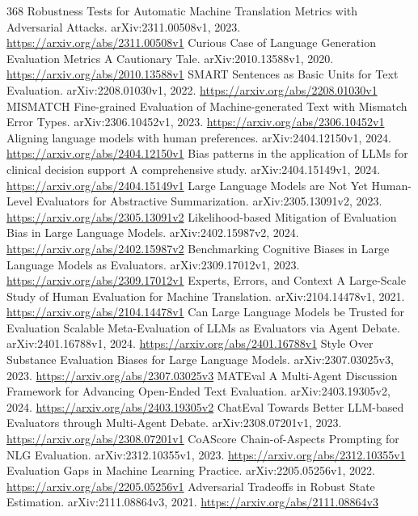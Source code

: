 \documentclass[11pt]{article}
\begin{document}
\begin{thebibliography}{368}
 Robustness Tests for Automatic Machine Translation Metrics with Adversarial Attacks. arXiv:2311.00508v1, 2023. \url{https://arxiv.org/abs/2311.00508v1}
 Curious Case of Language Generation Evaluation Metrics A Cautionary Tale. arXiv:2010.13588v1, 2020. \url{https://arxiv.org/abs/2010.13588v1}
 SMART Sentences as Basic Units for Text Evaluation. arXiv:2208.01030v1, 2022. \url{https://arxiv.org/abs/2208.01030v1}
 MISMATCH Fine-grained Evaluation of Machine-generated Text with Mismatch Error Types. arXiv:2306.10452v1, 2023. \url{https://arxiv.org/abs/2306.10452v1}
 Aligning language models with human preferences. arXiv:2404.12150v1, 2024. \url{https://arxiv.org/abs/2404.12150v1}
 Bias patterns in the application of LLMs for clinical decision support A comprehensive study. arXiv:2404.15149v1, 2024. \url{https://arxiv.org/abs/2404.15149v1}
 Large Language Models are Not Yet Human-Level Evaluators for Abstractive Summarization. arXiv:2305.13091v2, 2023. \url{https://arxiv.org/abs/2305.13091v2}
 Likelihood-based Mitigation of Evaluation Bias in Large Language Models. arXiv:2402.15987v2, 2024. \url{https://arxiv.org/abs/2402.15987v2}
 Benchmarking Cognitive Biases in Large Language Models as Evaluators. arXiv:2309.17012v1, 2023. \url{https://arxiv.org/abs/2309.17012v1}
 Experts, Errors, and Context A Large-Scale Study of Human Evaluation for Machine Translation. arXiv:2104.14478v1, 2021. \url{https://arxiv.org/abs/2104.14478v1}
 Can Large Language Models be Trusted for Evaluation Scalable Meta-Evaluation of LLMs as Evaluators via Agent Debate. arXiv:2401.16788v1, 2024. \url{https://arxiv.org/abs/2401.16788v1}
 Style Over Substance Evaluation Biases for Large Language Models. arXiv:2307.03025v3, 2023. \url{https://arxiv.org/abs/2307.03025v3}
 MATEval A Multi-Agent Discussion Framework for Advancing Open-Ended Text Evaluation. arXiv:2403.19305v2, 2024. \url{https://arxiv.org/abs/2403.19305v2}
 ChatEval Towards Better LLM-based Evaluators through Multi-Agent Debate. arXiv:2308.07201v1, 2023. \url{https://arxiv.org/abs/2308.07201v1}
 CoAScore Chain-of-Aspects Prompting for NLG Evaluation. arXiv:2312.10355v1, 2023. \url{https://arxiv.org/abs/2312.10355v1}
 Evaluation Gaps in Machine Learning Practice. arXiv:2205.05256v1, 2022. \url{https://arxiv.org/abs/2205.05256v1}
 Adversarial Tradeoffs in Robust State Estimation. arXiv:2111.08864v3, 2021. \url{https://arxiv.org/abs/2111.08864v3}

\end{thebibliography}
\end{document}
